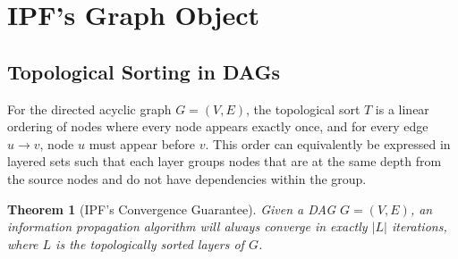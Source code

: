\documentclass[12pt]{report}
\newtheorem{theorem}{Theorem}
\begin{document}
\section{IPF's Graph Object}
\subsection{Topological Sorting in DAGs}
For the directed acyclic graph $G = (V, E)$, the topological sort $T$ is a linear ordering of nodes where every node appears exactly once, and for every edge $u \rightarrow v$, node $u$ must appear before $v$. This order can equivalently be expressed in layered sets such that each layer groups nodes that are at the same depth from the source nodes and do not have dependencies within the group. 

\begin{theorem}[IPF's Convergence Guarantee]
Given a DAG $G = (V, E)$, an information propagation algorithm will always converge in exactly $|L|$ iterations, where $L$ is the topologically sorted layers of $G$.
\end{theorem}
\end{document}

